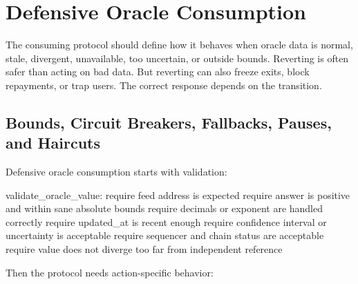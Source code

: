 \section{Defensive Oracle Consumption}

The consuming protocol should define how it behaves when oracle data is normal, stale, divergent, unavailable, too uncertain, or outside bounds. Reverting is often safer than acting on bad data. But reverting can also freeze exits, block repayments, or trap users. The correct response depends on the transition.

\subsection{Bounds, Circuit Breakers, Fallbacks, Pauses, and Haircuts}

Defensive oracle consumption starts with validation:

\begin{codeblock}
validate_oracle_value:
    require feed address is expected
    require answer is positive and within sane absolute bounds
    require decimals or exponent are handled correctly
    require updated_at is recent enough
    require confidence interval or uncertainty is acceptable
    require sequencer and chain status are acceptable
    require value does not diverge too far from independent reference
\end{codeblock}

Then the protocol needs action-specific behavior:

